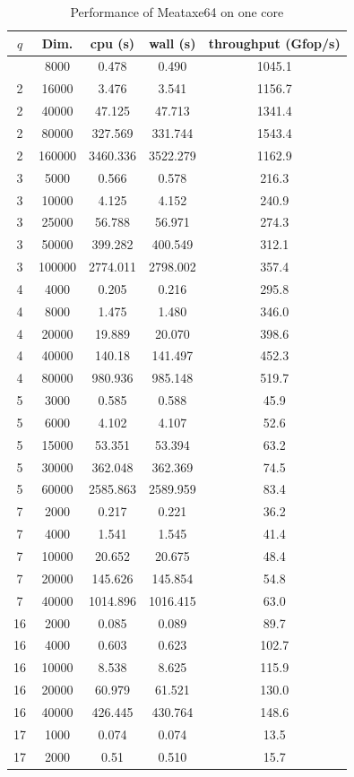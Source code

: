 \documentclass{deliverablereport}
\begin{document}
\begin{small}
\begin{center}
  \begin{longtable}{|c|c|c|c|c|}
    \caption[]{Performance of Meataxe64 on one core}\label{fig:matmult:mtx64}\\
    \hline
    $q$&Dim.&cpu (s)&wall (s) &throughput (Gfop/s)\\
    \hline
    \endhead
    \hline
    \endfoot
2&8000&0.478&0.490&1045.1\\
2&16000&3.476&3.541&1156.7\\
2&40000&47.125&47.713&1341.4\\
2&80000&327.569&331.744&1543.4\\
2&160000&3460.336&3522.279&1162.9\\
3&5000&0.566&0.578&216.3\\
3&10000&4.125&4.152&240.9\\
3&25000&56.788&56.971&274.3\\
3&50000&399.282&400.549&312.1\\
3&100000&2774.011&2798.002&357.4\\
4&4000&0.205&0.216&295.8\\
4&8000&1.475&1.480&346.0\\
4&20000&19.889&20.070&398.6\\
4&40000&140.18&141.497&452.3\\
4&80000&980.936&985.148&519.7\\
5&3000&0.585&0.588&45.9\\
5&6000&4.102&4.107&52.6\\
5&15000&53.351&53.394&63.2\\
5&30000&362.048&362.369&74.5\\
5&60000&2585.863&2589.959&83.4\\
7&2000&0.217&0.221&36.2\\
7&4000&1.541&1.545&41.4\\
7&10000&20.652&20.675&48.4\\
7&20000&145.626&145.854&54.8\\
7&40000&1014.896&1016.415&63.0\\
16&2000&0.085&0.089&89.7\\
16&4000&0.603&0.623&102.7\\
16&10000&8.538&8.625&115.9\\
16&20000&60.979&61.521&130.0\\
16&40000&426.445&430.764&148.6\\
17&1000&0.074&0.074&13.5\\
17&2000&0.51&0.510&15.7\\

\end{longtable}
\end{center}
\end{small}
\end{document}
